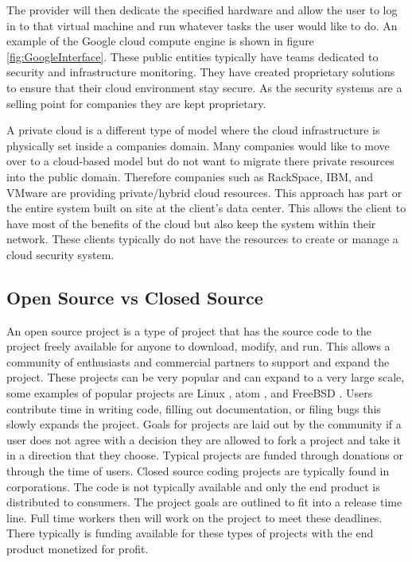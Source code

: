 \documentclass[12pt]{article}
\begin{document}
The provider will then dedicate the specified hardware and allow the user to log in to that virtual machine and run whatever tasks the user would like to do. An example of the Google cloud compute engine is shown in figure \ref{fig:GoogleInterface}.  These public entities typically have teams dedicated to security and infrastructure monitoring. They have created proprietary solutions to ensure that their cloud environment \cite{SecAmazon} stay secure. As the security systems are a selling point for companies they are kept proprietary.

A private cloud is a different type of model where the cloud infrastructure is physically set inside a companies domain. Many companies would like to move over to a cloud-based model but do not want to migrate there private resources into the public domain. Therefore companies such as RackSpace, IBM, and VMware are providing private/hybrid cloud resources. This approach has part or the entire system built on site at the client's data center. This allows the client to have most of the benefits of the cloud but also keep the system within their network. These clients typically do not have the resources to create or manage a cloud security system.

\subsection{Open Source vs Closed Source}
An open source project is a type of project that has the source code to the project freely available for anyone to download, modify, and run. This allows a community of enthusiasts and commercial partners to support and expand the project. These projects can be very popular and can expand to a very large scale, some examples of popular projects are Linux \cite{Linux}, atom \cite{atom}, and FreeBSD \cite{freebsd}. Users contribute time in writing code, filling out documentation, or filing bugs this slowly expands the project. Goals for projects are laid out by the community if a user does not agree with a decision they are allowed to fork a project and take it in a direction that they choose.  Typical projects are funded through donations or through the time of users.  Closed source coding projects are typically found in corporations. The code is not typically available and only the end product is distributed to consumers. The project goals are outlined to fit into a release time line. Full time workers then will work on the project to meet these deadlines. There typically is funding available for these types of projects with the end product monetized for profit.
\end{document}
